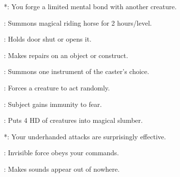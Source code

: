 \begin{list}{}{\leftmargin=1em}
\item {}*: You forge a limited mental bond with another creature.
\item {}: Summons magical riding horse for 2 hours/level.
\item {}: Holds door shut or opens it.
\item {}: Makes repairs on an object or construct.
\item {}: Summons one instrument of the caster's choice.
\item {}: Forces a creature to act randomly.
\item {}: Subject gains immunity to fear.
\item {}: Puts 4 HD of creatures into magical slumber.
\item {}*: Your underhanded attacks are surprisingly effective.
\item {}: Invisible force obeys your commands.
\item {}: Makes sounds appear out of nowhere.
\end{list}
